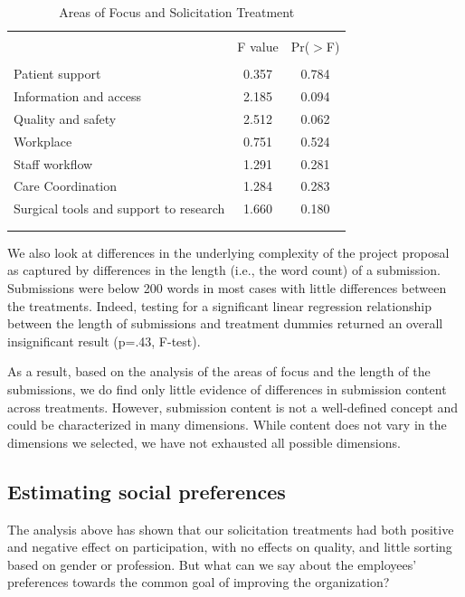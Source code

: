 \documentclass[12pt, titlepage]{article}
\begin{document}
\begin{table}
\centering
\caption{Areas of Focus and Solicitation Treatment}
\label{areas of focus}
\begin{tabular}{@{}lcc}
  \\[-1.8ex]\hline \hline \\[-1.8ex]
 & F value & Pr($>$F) \\ 
  \hline \\[-1.86ex]
Patient support & 0.357 & 0.784 \\ 
  Information and access & 2.185 & 0.094 \\ 
  Quality and safety  & 2.512 & 0.062 \\ 
  Workplace & 0.751 & 0.524 \\ 
  Staff workflow & 1.291 & 0.281 \\ 
  Care Coordination & 1.284 & 0.283 \\ 
  Surgical tools and support to research & 1.660 & 0.180 \\ 
   \\[-1.8ex]\hline \hline \\[-1.8ex]
\end{tabular}
\end{table}

We also look at differences in the underlying complexity of the project
proposal as captured by differences in the length (i.e., the word count)
of a submission. Submissions were below 200 words in most cases with
little differences between the treatments. Indeed, testing for a
significant linear regression relationship between the length of
submissions and treatment dummies returned an overall insignificant
result (p=.43, F-test).

As a result, based on the analysis of the areas of focus and the length
of the submissions, we do find only little evidence of differences in
submission content across treatments. However, submission content is not
a well-defined concept and could be characterized in many dimensions.
While content does not vary in the dimensions we selected, we have not
exhausted all possible dimensions.

\subsection{Estimating social
preferences}\label{estimating-social-preferences}

The analysis above has shown that our solicitation treatments had both
positive and negative effect on participation, with no effects on
quality, and little sorting based on gender or profession. But what can
we say about the employees' preferences towards the common goal of
improving the organization?
\end{document}
